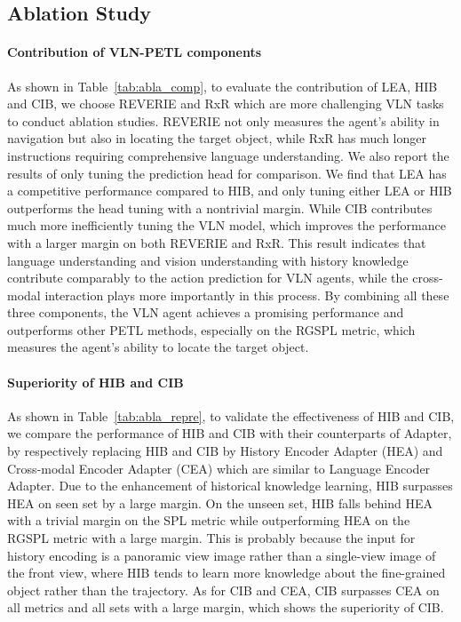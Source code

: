 \documentclass[10pt,twocolumn,letterpaper]{article}
\begin{document}
\subsection{Ablation Study}
\paragraph{Contribution of VLN-PETL components}
As shown in Table~\ref{tab:abla_comp}, to evaluate the contribution of LEA, HIB and CIB, we choose REVERIE and RxR which are more challenging VLN tasks to conduct ablation studies. REVERIE not only measures the agent's ability in navigation but also in locating the target object, while RxR has much longer instructions requiring comprehensive language understanding. We also report the results of only tuning the prediction head for comparison. We find that LEA has a competitive performance compared to HIB, and only tuning either LEA or HIB outperforms the head tuning with a nontrivial margin. While CIB contributes much more inefficiently tuning the VLN model, which improves the performance with a larger margin on both REVERIE and RxR. This result indicates that language understanding and vision understanding with history knowledge contribute comparably to the action prediction for VLN agents, while the cross-modal interaction plays more importantly in this process.
By combining all these three components, the VLN agent achieves a promising performance and outperforms other PETL methods, especially on the RGSPL metric, which measures the agent's ability to locate the target object. 

\vspace{-16pt}
\paragraph{Superiority of HIB and CIB}
As shown in Table~\ref{tab:abla_repre}, to validate the effectiveness of HIB and CIB, we compare the performance of HIB and CIB with their counterparts of Adapter, by respectively replacing HIB and CIB by History Encoder Adapter (HEA) and Cross-modal Encoder Adapter (CEA) which are similar to Language Encoder Adapter. Due to the enhancement of historical knowledge learning, HIB surpasses HEA on seen set by a large margin. On the unseen set, HIB falls behind HEA with a trivial margin on the SPL metric while outperforming HEA on the RGSPL metric with a large margin. This is probably because the input for history encoding is a panoramic view image rather than a single-view image of the front view, where HIB tends to learn more knowledge about the fine-grained object rather than the trajectory. As for CIB and CEA, CIB surpasses CEA on all metrics and all sets with a large margin, which shows the superiority of CIB.
\end{document}
